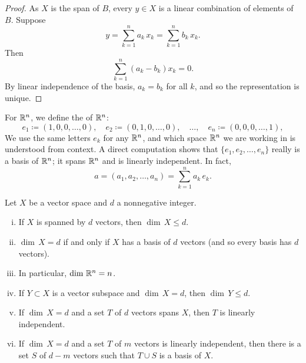 \begin{proof}
As $X$ is the span of $B$,
every $y \in X$ is a linear combination of elements of $B$.
Suppose
\begin{equation*}
y = \sum_{k=1}^n a_k \, x_k = \sum_{k=1}^n b_k \, x_k .
\end{equation*}
Then
\begin{equation*}
\sum_{k=1}^n (a_k-b_k) x_k = 0 .
\end{equation*}
By linear independence of the basis, $a_k = b_k$ for all $k$, and so
the representation is unique.
\end{proof}

For ${\mathbb{R}}^n$,
we define
the \emph{} of ${\mathbb{R}}^n$:
\begin{equation*}
e_1 \coloneqq (1,0,0,\ldots,0) , \quad
e_2 \coloneqq (0,1,0,\ldots,0) , \quad \ldots, \quad
e_n \coloneqq (0,0,0,\ldots,1) ,
\end{equation*}
We use the same letters $e_k$ for any ${\mathbb{R}}^n$, and
which space ${\mathbb{R}}^n$ we are working in is understood from context.
A direct computation shows that $\{ e_1, e_2, \ldots, e_n \}$ really is
a basis of ${\mathbb{R}}^n$; it spans ${\mathbb{R}}^n$ and is
linearly independent.  In fact,
\begin{equation*}
a = (a_1,a_2,\ldots,a_n) = \sum_{k=1}^n a_k \, e_k .
\end{equation*}

\begin{prop} \label{mv:dimprop}
\pagebreak[2]
Let $X$ be a vector space and $d$ a nonnegative integer.
\begin{enumerate}[(i)]
\item \label{mv:dimprop:i}
If $X$ is spanned by $d$ vectors, then $\dim \, X \leq d$.
\item \label{mv:dimprop:ii}
$\dim \, X = d$ if and only if $X$ has a basis of $d$
vectors (and so every basis has $d$ vectors).
\item \label{mv:dimprop:iii}
In particular, $\dim \, {\mathbb{R}}^n = n$.
\item \label{mv:dimprop:iv}
If $Y \subset X$ is a vector subspace and $\dim \, X = d$,
then $\dim \, Y \leq d$.
\item \label{mv:dimprop:v}
If $\dim \, X = d$ and a set $T$ of $d$ vectors spans $X$,
then $T$ is linearly independent.
\item \label{mv:dimprop:vi}
If $\dim \, X = d$ and a set $T$ of $m$ vectors is
linearly independent, then there is a set $S$ of $d-m$
vectors such that $T \cup S$ is a basis of $X$.
\end{enumerate}
\end{prop}


